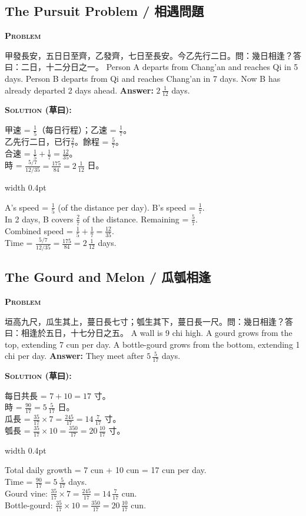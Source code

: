 \documentclass[10pt,a4paper]{article}
\newcommand{\zh}[1]{{\CJKfamily{notocjksc}#1}}
\newcommand{\bilingual}[2]{%
  \par\smallskip\noindent%
  \begin{minipage}[t]{0.47\textwidth}%
    \RaggedRight\small #1%
  \end{minipage}%
  \hfill\vrule width 0.4pt\hfill%
  \begin{minipage}[t]{0.47\textwidth}%
    \RaggedRight\small #2%
  \end{minipage}%
  \par\smallskip%
}
\newenvironment{biproblem}[2][]{%
  \par\smallskip\vspace{1.5ex}%
  \noindent\textbf{\textcolor{problemframe}{\textsc{Problem} #1}}\par\smallskip
  \bgroup\small%
}{%
  \egroup\par\smallskip
}
\newenvironment{bisolution}{%
  \par\smallskip\noindent\textbf{\textcolor{notecolor}{\textsc{Solution} (草曰):}}\par\smallskip\itshape\small%
}{%
  \par\smallskip\normalfont%
}
\begin{document}
\subsection{The Pursuit Problem / 相遇問題}

\begin{biproblem}
\bilingual{
  \zh{甲發長安，五日日至齊，乙發齊，七日至長安。今乙先行二日。問：幾日相逢？答曰：二日，十二分日之一。}
}{%
  Person A departs from Chang'an and reaches Qi in 5 days. Person B departs from Qi and reaches Chang'an in 7 days. Now B has already departed 2 days ahead. \textbf{Answer:} $2\,\frac{1}{12}$ days.
}
\end{biproblem}

\begin{bisolution}
\bilingual{
  甲速 = $\frac{1}{5}$（每日行程）；乙速 = $\frac{1}{7}$。\\
  乙先行二日，已行$\frac{2}{7}$。餘程 = $\frac{5}{7}$。\\
  合速 = $\frac{1}{5} + \frac{1}{7} = \frac{12}{35}$。\\
  時 = $\frac{5/7}{12/35} = \frac{175}{84} = 2\,\frac{1}{12}$ 日。
}{%
  A's speed = $\frac{1}{5}$ (of the distance per day). B's speed = $\frac{1}{7}$.\\
  In 2 days, B covers $\frac{2}{7}$ of the distance. Remaining = $\frac{5}{7}$.\\
  Combined speed = $\frac{1}{5} + \frac{1}{7} = \frac{12}{35}$.\\
  Time = $\frac{5/7}{12/35} = \frac{175}{84} = 2\,\frac{1}{12}$ days.
}
\end{bisolution}

\subsection{The Gourd and Melon / 瓜瓠相逢}

\begin{biproblem}
\bilingual{
  \zh{垣高九尺，瓜生其上，蔓日長七寸；瓠生其下，蔓日長一尺。問：幾日相逢？答曰：相逢於五日，十七分日之五。}
}{%
  A wall is 9 chi high. A gourd grows from the top, extending 7 cun per day. A bottle-gourd grows from the bottom, extending 1 chi per day. \textbf{Answer:} They meet after $5\,\frac{5}{17}$ days.
}
\end{biproblem}

\begin{bisolution}
\bilingual{
  每日共長 = $7 + 10 = 17$ 寸。\\
  時 = $\frac{90}{17} = 5\,\frac{5}{17}$ 日。\\
  瓜長 = $\frac{35}{17} \times 7 = \frac{245}{17} = 14\,\frac{7}{17}$ 寸。\\
  瓠長 = $\frac{35}{17} \times 10 = \frac{350}{17} = 20\,\frac{10}{17}$ 寸。
}{%
  Total daily growth = 7 cun + 10 cun = 17 cun per day.\\
  Time = $\frac{90}{17} = 5\,\frac{5}{17}$ days.\\
  Gourd vine: $\frac{35}{17} \times 7 = \frac{245}{17} = 14\,\frac{7}{17}$ cun.\\
  Bottle-gourd: $\frac{35}{17} \times 10 = \frac{350}{17} = 20\,\frac{10}{17}$ cun.
}
\end{bisolution}
\end{document}
